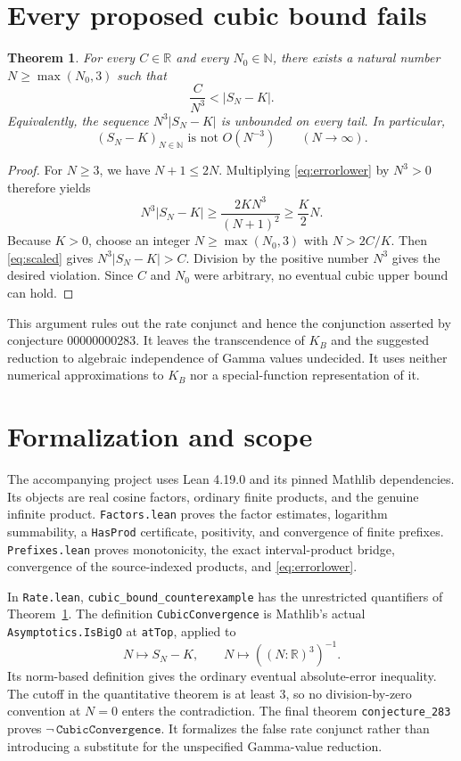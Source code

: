 \documentclass[10pt,letterpaper]{article}
\newtheorem{theorem}{Theorem}
\newcommand{\R}{\mathbb{R}}
\newcommand{\N}{\mathbb{N}}
\begin{document}
\section{Every proposed cubic bound fails}
\begin{theorem}\label{thm:failure}
For every $C\in\R$ and every $N_0\in\N$, there exists a natural number $N\ge\max(N_0,3)$ such that
\[
\frac{C}{N^3}<|S_N-K|.
\]
Equivalently, the sequence $N^3|S_N-K|$ is unbounded on every tail. In particular,
\[
(S_N-K)_{N\in\N}\text{ is not }O(N^{-3})\qquad(N\to\infty).
\]
\end{theorem}
\begin{proof}
For $N\ge3$, we have $N+1\le2N$. Multiplying \eqref{eq:errorlower} by $N^3>0$ therefore yields
\begin{equation}\label{eq:scaled}
N^3|S_N-K|\ge\frac{2K N^3}{(N+1)^2}\ge\frac K2N.
\end{equation}
Because $K>0$, choose an integer $N\ge\max(N_0,3)$ with $N>2C/K$. Then \eqref{eq:scaled} gives $N^3|S_N-K|>C$. Division by the positive number $N^3$ gives the desired violation. Since $C$ and $N_0$ were arbitrary, no eventual cubic upper bound can hold.
\end{proof}

This argument rules out the rate conjunct and hence the conjunction asserted by conjecture 00000000283. It leaves the transcendence of $K_B$ and the suggested reduction to algebraic independence of Gamma values undecided. It uses neither numerical approximations to $K_B$ nor a special-function representation of it.

\section{Formalization and scope}
The accompanying project uses Lean 4.19.0 and its pinned Mathlib dependencies. Its objects are real cosine factors, ordinary finite products, and the genuine infinite product. \texttt{Factors.lean} proves the factor estimates, logarithm summability, a \texttt{HasProd} certificate, positivity, and convergence of finite prefixes. \texttt{Prefixes.lean} proves monotonicity, the exact interval-product bridge, convergence of the source-indexed products, and \eqref{eq:errorlower}.

In \texttt{Rate.lean}, \texttt{cubic\_bound\_counterexample} has the unrestricted quantifiers of Theorem~\ref{thm:failure}. The definition \texttt{CubicConvergence} is Mathlib's actual \texttt{Asymptotics.IsBigO} at \texttt{atTop}, applied to
\[
N\longmapsto S_N-K,\qquad N\longmapsto ((N:\R)^3)^{-1}.
\]
Its norm-based definition gives the ordinary eventual absolute-error inequality. The cutoff in the quantitative theorem is at least $3$, so no division-by-zero convention at $N=0$ enters the contradiction. The final theorem \texttt{conjecture\_283} proves $\neg\,\texttt{CubicConvergence}$. It formalizes the false rate conjunct rather than introducing a substitute for the unspecified Gamma-value reduction.
\end{document}
